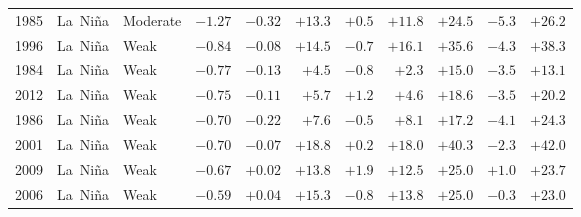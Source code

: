 \begin{tabular}{rllrrrrrrrr}
1985 & La~Ni\~na & Moderate & $-1.27$ & $-0.32$ & $+13.3$ & $+0.5$ & $+11.8$ & $+24.5$ & $-5.3$ & $+26.2$ \\
1996 & La~Ni\~na & Weak & $-0.84$ & $-0.08$ & $+14.5$ & $-0.7$ & $+16.1$ & $+35.6$ & $-4.3$ & $+38.3$ \\
1984 & La~Ni\~na & Weak & $-0.77$ & $-0.13$ & $+4.5$ & $-0.8$ & $+2.3$ & $+15.0$ & $-3.5$ & $+13.1$ \\
2012 & La~Ni\~na & Weak & $-0.75$ & $-0.11$ & $+5.7$ & $+1.2$ & $+4.6$ & $+18.6$ & $-3.5$ & $+20.2$ \\
1986 & La~Ni\~na & Weak & $-0.70$ & $-0.22$ & $+7.6$ & $-0.5$ & $+8.1$ & $+17.2$ & $-4.1$ & $+24.3$ \\
2001 & La~Ni\~na & Weak & $-0.70$ & $-0.07$ & $+18.8$ & $+0.2$ & $+18.0$ & $+40.3$ & $-2.3$ & $+42.0$ \\
2009 & La~Ni\~na & Weak & $-0.67$ & $+0.02$ & $+13.8$ & $+1.9$ & $+12.5$ & $+25.0$ & $+1.0$ & $+23.7$ \\
2006 & La~Ni\~na & Weak & $-0.59$ & $+0.04$ & $+15.3$ & $-0.8$ & $+13.8$ & $+25.0$ & $-0.3$ & $+23.0$ \\
\hline
\end{tabular}
\par{}
